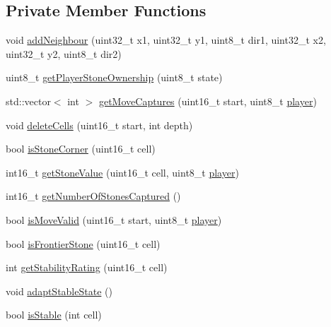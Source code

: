 \subsection*{Private Member Functions}
\begin{DoxyCompactItemize}
\item 
void \hyperlink{class_map_af80eeeb2b9e6552a85fa99aeaa096916}{add\+Neighbour} (uint32\+\_\+t x1, uint32\+\_\+t y1, uint8\+\_\+t dir1, uint32\+\_\+t x2, uint32\+\_\+t y2, uint8\+\_\+t dir2)
\item 
uint8\+\_\+t \hyperlink{class_map_ad929b595c6e3d90342716152a6643481}{get\+Player\+Stone\+Ownership} (uint8\+\_\+t state)
\item 
std\+::vector$<$ int $>$ \hyperlink{class_map_a07214e2fc3d6e1d3c2a7c3e8f08f9d5d}{get\+Move\+Captures} (uint16\+\_\+t start, uint8\+\_\+t \hyperlink{_reversi_a_i_8cpp_ae41164029686cac80f7f6bd7aa23b153}{player})
\item 
void \hyperlink{class_map_ab27fcf371602bf6ea6135c7fcdea444a}{delete\+Cells} (uint16\+\_\+t start, int depth)
\item 
bool \hyperlink{class_map_ab20738276b1f820541c6c38b30a7e414}{is\+Stone\+Corner} (uint16\+\_\+t cell)
\item 
int16\+\_\+t \hyperlink{class_map_ae8f7cc293b2ba9d2bf04ef09514e0907}{get\+Stone\+Value} (uint16\+\_\+t cell, uint8\+\_\+t \hyperlink{_reversi_a_i_8cpp_ae41164029686cac80f7f6bd7aa23b153}{player})
\item 
int16\+\_\+t \hyperlink{class_map_ac6bb7b843ede3af0a1307f318cd121ee}{get\+Number\+Of\+Stones\+Captured} ()
\item 
bool \hyperlink{class_map_a0321a3077f0523ec7e8c10ac4304ef2c}{is\+Move\+Valid} (uint16\+\_\+t start, uint8\+\_\+t \hyperlink{_reversi_a_i_8cpp_ae41164029686cac80f7f6bd7aa23b153}{player})
\item 
bool \hyperlink{class_map_a0ebb38e5ac608e8d7bbf4a1946511430}{is\+Frontier\+Stone} (uint16\+\_\+t cell)
\item 
int \hyperlink{class_map_a56b0871276d54dd1ef8563317d0919e7}{get\+Stability\+Rating} (uint16\+\_\+t cell)
\item 
void \hyperlink{class_map_a2557150bc6652c959c7c4b7e06b5d119}{adapt\+Stable\+State} ()
\item 
bool \hyperlink{class_map_a4ac289fbfff56fdabe9dc23636b815d5}{is\+Stable} (int cell)
\end{DoxyCompactItemize}
